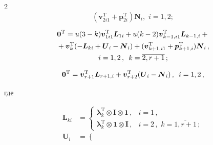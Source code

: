 \begin{multicols}{2}
\begin{equation}
(\boldsymbol{v}_{2i1}^{\mathrm{T}}+\boldsymbol{p}_{2i}^{\mathrm{T}})\boldsymbol{N}_i,\,\, i=1,2;

\end{equation}

\begin{multline}

\label{eq:24}

\boldsymbol{0}^{\mathrm{T}}=u(3-k)\boldsymbol{v}_{1i1}^{\mathrm{T}}\boldsymbol{L}_{1i}+

u(k-2)\boldsymbol{v}_{k-1,i1}^{\mathrm{T}}\boldsymbol{L}_{k-1,i}+{}\\

{}+\boldsymbol{v}_k^{\mathrm{T}}(-\boldsymbol{L}_{ki}+\boldsymbol{U}_i-\boldsymbol{N}_i)

+(\boldsymbol{v}_{k+1,i1}^{\mathrm{T}}+\boldsymbol{p}_{k+1,i}^{\mathrm{T}})\boldsymbol{N}_i\,,\\

i=1,2\,,\enskip k=\overline{2,r+1}\,;

\end{multline}

\begin{equation}

\label{eq:25}

\boldsymbol{0}^{\mathrm{T}}=\boldsymbol{v}_{r+1}^{\mathrm{T}}\boldsymbol{L}_{r+1,i}+

\boldsymbol{v}_{r+2}^{\mathrm{T}}(\boldsymbol{U}_i-\boldsymbol{N}_i)\,,\enskip i=1,2\,,

\end{equation}

где

\begin{align*}

\boldsymbol{L}_{ki}&=

\begin{cases}

\boldsymbol{\lambda}_k^{\mathrm{T}}\otimes\boldsymbol{I}\otimes\boldsymbol{1}\,, & i=1\,,\\[6pt]

\boldsymbol{\lambda}_k^{\mathrm{T}}\otimes\boldsymbol{1}\otimes\boldsymbol{I}\,, &i=2\,,\,\,

k=\overline{1,r+1}\,;

\end{cases}

\\

\boldsymbol{U}_i&=

\begin{cases}


\end{cases}
\end{align*}
\end{multicols}
